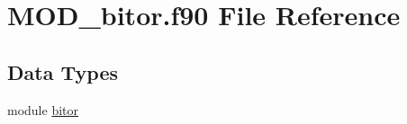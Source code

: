 \hypertarget{MOD__bitor_8f90}{\section{M\-O\-D\-\_\-bitor.\-f90 File Reference}
\label{MOD__bitor_8f90}
}
\subsection*{Data Types}
\begin{DoxyCompactItemize}
\item 
module \hyperlink{classbitor}{bitor}
\end{DoxyCompactItemize}
